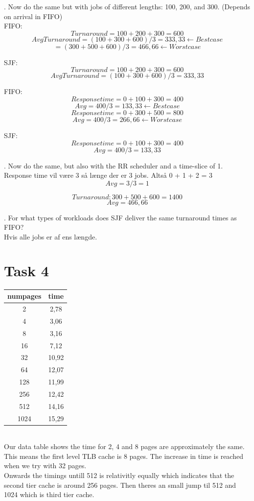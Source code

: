 \documentclass[12pt]{article}
\begin{document}
. Now do the same but with jobs of different lengths: 100, 200, and 300.      (Depends on arrival in FIFO)\\

\noindent FIFO: 
$$Turnaround = 100 + 200 + 300 = 600$$     $$AvgTurnaround = (100 + 300 + 600) / 3 = 333,33     \leftarrow Best case$$
							   $$= (300 + 500 + 600) / 3 = 466,66     \leftarrow Worst case$$

\noindent SJF:
$$Turnaround = 100 + 200 + 300 = 600$$     $$AvgTurnaround = (100 + 300 + 600) / 3 = 333,33$$

\noindent FIFO: 
$$Response time = 0 + 100 + 300 = 400$$    $$Avg = 400/3 = 	133,33     \leftarrow Best case$$
      $$Response time = 0 + 300 + 500 = 800$$    $$Avg = 400/3 = 	266,66     \leftarrow Worst case$$
							   
\noindent SJF:  
$$Response time = 0 + 100 + 300 = 400$$    $$Avg = 400/3 = 	133,33$$


. Now do the same, but also with the RR scheduler and a time-slice of 1.\\
Response time vil være 3 så længe der er 3 jobs. Altså 0 + 1 + 2 = 3         
$$Avg = 3 / 3 = 1$$

$$Turnaround: 300 + 500 + 600 = 1400$$        $$Avg = 466,66$$

. For what types of workloads does SJF deliver the same turnaround times as FIFO?\\
Hvis alle jobs er af ens længde.


\section*{Task 4}

\begin{tabular}{|c|c|}
  \hline
  numpages & time\\
  \hline
  2 & 2,78\\
  4 & 3,06\\
  8 & 3,16\\
  16 & 7,12\\
  32 & 10,92\\
  64 & 12,07\\
  128 & 11,99\\
  256 & 12,42\\
  512 & 14,16\\
  1024 & 15,29\\
  \hline
\end{tabular}\\
Our data table shows the time for 2, 4 and 8 pages are approximately the same. This means the first level TLB cache is 8 pages. The increase in time is reached when we try with 32 pages. \\
Onwards the timings untill 512 is relativitly equally which indicates that the second tier cache is around 256 pages. Then theres an small jump til 512 and 1024 which is third tier cache. 
\end{document}
